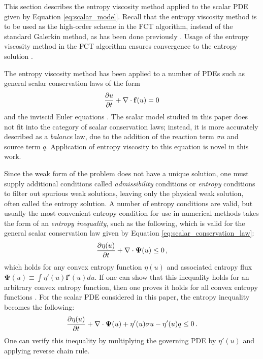 
This section describes the entropy viscosity method applied to the scalar
PDE given by Equation \eqref{eq:scalar_model}. Recall that the entropy
viscosity method is to be used as the high-order scheme in the FCT algorithm,
instead of the standard Galerkin method, as has been done previously
\cite{kuzmin_FCT}.
Usage of the entropy viscosity method in the FCT algorithm ensures convergence
to the entropy solution \cite{guermond_secondorder}.

The entropy viscosity method has been applied to a number of PDEs
such as general scalar conservation laws of the form
\begin{equation}\label{eq:scalar_conservation_law}
  \frac{\partial u}{\partial t} + \nabla\cdot\mathbf{f}(u) = 0
\end{equation}
and the inviscid Euler equations \cite{guermond_ev}. The scalar model studied
in this paper does not fit into the category of scalar conservation laws;
instead, it is more accurately described as a \emph{balance} law, due to
the addition of the reaction term $\sigma u$ and source term $q$. Application
of entropy viscosity to this equation is novel in this work.

Since the weak form of the problem does not have a unique solution, one
must supply additional conditions called \emph{admissibility} conditions or
\emph{entropy} conditions to filter out spurious weak solutions, leaving
only the physical weak solution, often called the entropy solution.
A number of entropy conditions are valid, but usually the most convenient
entropy condition for use in numerical methods takes the form of an
\emph{entropy inequality}, such as the following, which is valid for the
general scalar conservation law given by Equation \eqref{eq:scalar_conservation_law}:
\begin{equation}
  \frac{\partial \eta(u)}{\partial t} + \nabla\cdot\mathbf{\Psi}(u) \leq 0 \,,
\end{equation}
which holds for any convex entropy function $\eta(u)$ and associated entropy
flux $\mathbf{\Psi}(u) \equiv \int \eta'(u)\mathbf{f}'(u)du$.
If one can show that this inequality holds for an arbitrary
convex entropy function, then one proves it holds for all convex entropy
functions  \cite{leveque2002}\cite{guermond_ev}.
For the scalar PDE considered in this paper, the entropy inequality becomes
the following:
\begin{equation}
  \frac{\partial \eta(u)}{\partial t} + \nabla\cdot\mathbf{\Psi}(u) + \eta'(u)\sigma u - \eta'(u)q
    \leq 0 \,.
\end{equation}
One can verify this inequality by multiplying the governing PDE by $\eta'(u)$
and applying reverse chain rule.


